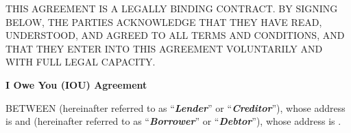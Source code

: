 
\begin{sloppypar}
THIS AGREEMENT IS A LEGALLY BINDING CONTRACT. BY SIGNING BELOW, THE PARTIES ACKNOWLEDGE THAT THEY HAVE READ, UNDERSTOOD, AND AGREED TO ALL TERMS AND CONDITIONS, AND THAT THEY ENTER INTO THIS AGREEMENT VOLUNTARILY AND WITH FULL LEGAL CAPACITY.
\end{sloppypar}

\begin{center}

\textbf{I Owe You (IOU) Agreement}

\end{center}

\begin{sloppypar}
BETWEEN \LenderName{} (hereinafter referred to as “\textbf{\textit{Lender}}” or “\textbf{\textit{Creditor}}”), whose address is \LenderAddress{} and \BorrowerName{} (hereinafter referred to as  “\textbf{\textit{Borrower}}” or “\textbf{\textit{Debtor}}”), whose address is \BorrowerAddress{}.
\end{sloppypar}

